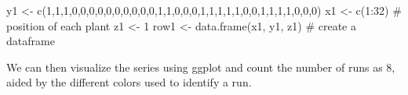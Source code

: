 \documentclass[
  letterpaper,
]{book}
\newenvironment{Shaded}{\begin{snugshade}}{\end{snugshade}}
\newcommand{\CommentTok}[1]{\textcolor[rgb]{0.37,0.37,0.37}{#1}}
\newcommand{\DecValTok}[1]{\textcolor[rgb]{0.68,0.00,0.00}{#1}}
\newcommand{\FunctionTok}[1]{\textcolor[rgb]{0.28,0.35,0.67}{#1}}
\newcommand{\NormalTok}[1]{\textcolor[rgb]{0.00,0.23,0.31}{#1}}
\newcommand{\OtherTok}[1]{\textcolor[rgb]{0.00,0.23,0.31}{#1}}
\newcommand{\SpecialCharTok}[1]{\textcolor[rgb]{0.37,0.37,0.37}{#1}}
\begin{document}
\begin{Shaded}
\begin{Highlighting}[]
\NormalTok{y1 }\OtherTok{\textless{}{-}} \FunctionTok{c}\NormalTok{(}\DecValTok{1}\NormalTok{,}\DecValTok{1}\NormalTok{,}\DecValTok{1}\NormalTok{,}\DecValTok{0}\NormalTok{,}\DecValTok{0}\NormalTok{,}\DecValTok{0}\NormalTok{,}\DecValTok{0}\NormalTok{,}\DecValTok{0}\NormalTok{,}\DecValTok{0}\NormalTok{,}\DecValTok{0}\NormalTok{,}\DecValTok{0}\NormalTok{,}\DecValTok{0}\NormalTok{,}\DecValTok{0}\NormalTok{,}\DecValTok{1}\NormalTok{,}\DecValTok{1}\NormalTok{,}\DecValTok{0}\NormalTok{,}\DecValTok{0}\NormalTok{,}\DecValTok{0}\NormalTok{,}\DecValTok{1}\NormalTok{,}\DecValTok{1}\NormalTok{,}\DecValTok{1}\NormalTok{,}\DecValTok{1}\NormalTok{,}\DecValTok{1}\NormalTok{,}\DecValTok{0}\NormalTok{,}\DecValTok{0}\NormalTok{,}\DecValTok{1}\NormalTok{,}\DecValTok{1}\NormalTok{,}\DecValTok{1}\NormalTok{,}\DecValTok{1}\NormalTok{,}\DecValTok{0}\NormalTok{,}\DecValTok{0}\NormalTok{,}\DecValTok{0}\NormalTok{)}
\NormalTok{x1 }\OtherTok{\textless{}{-}} \FunctionTok{c}\NormalTok{(}\DecValTok{1}\SpecialCharTok{:}\DecValTok{32}\NormalTok{) }\CommentTok{\# position of each plant}
\NormalTok{z1 }\OtherTok{\textless{}{-}} \DecValTok{1}
\NormalTok{row1 }\OtherTok{\textless{}{-}} \FunctionTok{data.frame}\NormalTok{(x1, y1, z1) }\CommentTok{\# create a dataframe}
\end{Highlighting}
\end{Shaded}

We can then visualize the series using ggplot and count the number of
runs as 8, aided by the different colors used to identify a run.
\end{document}

